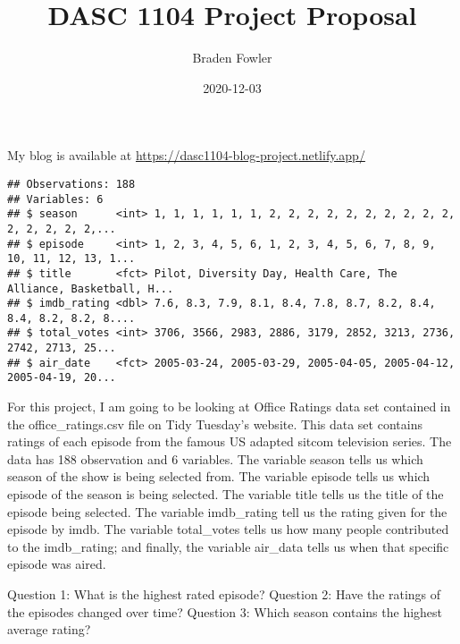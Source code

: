 \documentclass[
]{article}
\title{DASC 1104 Project Proposal}
\author{Braden Fowler}
\date{2020-12-03}
\newenvironment{Shaded}{\begin{snugshade}}{\end{snugshade}}
\newcommand{\DataTypeTok}[1]{\textcolor[rgb]{0.13,0.29,0.53}{#1}}
\newcommand{\KeywordTok}[1]{\textcolor[rgb]{0.13,0.29,0.53}{\textbf{#1}}}
\newcommand{\NormalTok}[1]{#1}
\newcommand{\OperatorTok}[1]{\textcolor[rgb]{0.81,0.36,0.00}{\textbf{#1}}}
\newcommand{\OtherTok}[1]{\textcolor[rgb]{0.56,0.35,0.01}{#1}}
\begin{document}
\maketitle

My blog is available at \url{https://dasc1104-blog-project.netlify.app/}

\begin{Shaded}
\end{Shaded}

\begin{verbatim}
## Observations: 188
## Variables: 6
## $ season      <int> 1, 1, 1, 1, 1, 1, 2, 2, 2, 2, 2, 2, 2, 2, 2, 2, 2, 2, 2, 2, 2,...
## $ episode     <int> 1, 2, 3, 4, 5, 6, 1, 2, 3, 4, 5, 6, 7, 8, 9, 10, 11, 12, 13, 1...
## $ title       <fct> Pilot, Diversity Day, Health Care, The Alliance, Basketball, H...
## $ imdb_rating <dbl> 7.6, 8.3, 7.9, 8.1, 8.4, 7.8, 8.7, 8.2, 8.4, 8.4, 8.2, 8.2, 8....
## $ total_votes <int> 3706, 3566, 2983, 2886, 3179, 2852, 3213, 2736, 2742, 2713, 25...
## $ air_date    <fct> 2005-03-24, 2005-03-29, 2005-04-05, 2005-04-12, 2005-04-19, 20...
\end{verbatim}

For this project, I am going to be looking at Office Ratings data set
contained in the office\_ratings.csv file on Tidy Tuesday's website.
This data set contains ratings of each episode from the famous US
adapted sitcom television series. The data has 188 observation and 6
variables. The variable season tells us which season of the show is
being selected from. The variable episode tells us which episode of the
season is being selected. The variable title tells us the title of the
episode being selected. The variable imdb\_rating tell us the rating
given for the episode by imdb. The variable total\_votes tells us how
many people contributed to the imdb\_rating; and finally, the variable
air\_data tells us when that specific episode was aired.

Question 1: What is the highest rated episode? Question 2: Have the
ratings of the episodes changed over time? Question 3: Which season
contains the highest average rating?
\end{document}
